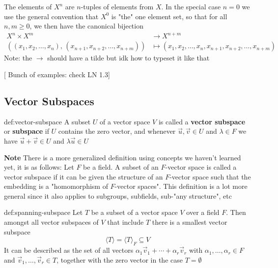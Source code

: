 \documentclass{article}
\begin{document}
The elements of $X^{n}$ are $n$-tuples of elements from $X$. In the special case $n = 0$ we use the general convention that $X^{0}$ is "the" one element set, so that for all $n,m\ge 0$, we then have the canonical bijection
\begin{align*}
    X^{n} \times X^{m} &\to X^{n + m} \\
    ((x_{1},x_{2},\dots,x_{n}),\,(x_{n+1}, x_{n+2},\dots,x_{n+m})) &\mapsto (x_{1},x_{2},\dots,x_{n},x_{n+1},x_{n+2},\dots,x_{n+m})
\end{align*}
Note: the $\to$ should have a tilde but idk how to typeset it like that

[ Bunch of examples: check LN 1.3]

\subsection{Vector Subspaces}

\begin{dfn}{def:vector-subspace}{}
    A subset $U$ of a vector space $V$ is called a \textbf{vector subspace} or \textbf{subspace} if $U$ contains the zero vector, and whenever $\vec{u},\vec{v}\in U$ and $\lambda\in F$ we have $\vec{u} + \vec{v}\in U$ and $\lambda \vec{u}\in U$
\end{dfn}

\textbf{Note} There is a more generalized definition using concepts we haven't learned yet, it is as follows: Let $F$ be a field. A subset of an $F$-vector space is called a vector subspace if it can be given the structure of an $F$-vector space such that the embedding is a "homomorphism of $F$-vector spaces". This definition is a lot more general since it also applies to subgroups, subfields, sub-"any structure", etc

\begin{dfn}{def:spanning-subspace}{}
    Let $T$ be a subset of a vector space $V$ over a field $F$. Then amongst all vector subspaces of $V$ that include $T$ there is a smallest vector subspace
    \[\langle T \rangle = \langle T \rangle_{F} \subseteq V\]
    It can be described as the set of all vectors $\alpha_{1}\vec{v}_{1} + \cdots + \alpha_{r}\vec{v}_{r}$ with $\alpha_{1},\dots,\alpha_{r}\in F$ and $\vec{v}_{1},\dots,\vec{v}_{r}\in T$, together with the zero vector in the case $T = \emptyset$
\end{dfn}
\end{document}
